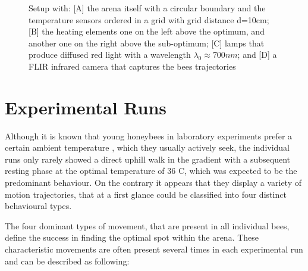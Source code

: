 \begin{figure}%
    \centering
    \caption{Setup with: [A] the arena itself with a circular boundary and the temperature sensors ordered in a grid with grid distance d=10cm; [B] the heating elements one on the left above the optimum, and another one on the right above the sub-optimum; [C] lamps that produce diffused red light with a wavelength $\lambda_{0} \approx 700nm$; and [D] a FLIR infrared camera that captures the bees trajectories}
    \label{fig:Setup}
\end{figure}

\section{Experimental Runs}

Although it is known that young honeybees in laboratory experiments prefer a certain ambient temperature \cite{heran1952}, which they usually actively seek, the individual runs only rarely showed a direct uphill walk in the gradient with a subsequent resting phase at the optimal temperature of 36 \textdegree C, which was expected to be the predominant behaviour.
On the contrary it appears that they display a variety of motion trajectories, that at a first glance could be classified into four distinct behavioural types.

The four dominant types of movement, that are present in all individual bees, define the success in finding the optimal spot within the arena. These characteristic movements are often present several times in each experimental run and can be described as following:


